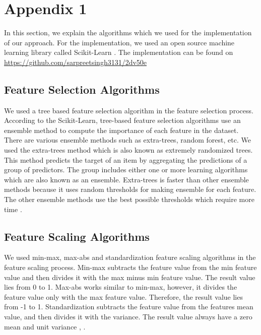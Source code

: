\documentclass[a4paper,12pt]{article}
\begin{document}
\section{Appendix 1} \label{Appendix}
In this section, we explain the algorithms which we used for the implementation of our approach. For the implementation, we used an open source machine learning library called Scikit-Learn \cite{SLMLIP-2011}. The implementation can be found on \\ \url{https://github.com/sarpreetsingh3131/2dv50e}
\subsection{Feature Selection Algorithms} \label{FeatureSelectionAlgorithms}
We used a tree based feature selection algorithm in the feature selection process. According to the Scikit-Learn, tree-based feature selection algorithms use an ensemble method to compute the importance of each feature in the dataset. There are various ensemble methods such as extra-trees, random forest, etc. We used the extra-trees method which is also known as extremely randomized trees. This method predicts the target of an item by aggregating the predictions of a group of predictors. The group includes either one or more learning algorithms which are also known as an ensemble. Extra-trees is faster than other ensemble methods because it uses random thresholds for making ensemble for each feature. The other ensemble methods use the best possible thresholds which require more time \cite{HOMLWSLATF-2017}.
\subsection{Feature Scaling Algorithms} \label{FeatureScalingAlgorithms}
We used min-max, max-abs and standardization feature scaling algorithms in the feature scaling process. Min-max subtracts the feature value from the min feature value and then divides it with the max minus min feature value. The result value lies from 0 to 1. Max-abs works similar to min-max, however, it divides the feature value only with the max feature value. Therefore, the result value lies from -1 to 1. Standardization subtracts the feature value from the features mean value, and then divides it with the variance. The result value always have a zero mean and unit variance \cite{HOMLWSLATF-2017}, \cite{SLMLIP-2011}. 
\end{document}
